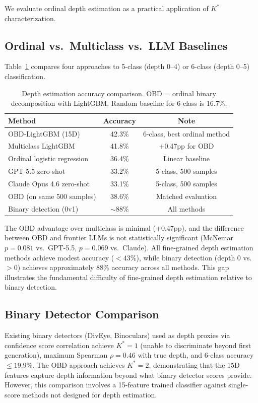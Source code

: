 \documentclass[11pt]{article}
\newcommand{\kstar}{K^*}
\begin{document}
We evaluate ordinal depth estimation as a practical application of $\kstar$ characterization.

\subsection{Ordinal vs.\ Multiclass vs.\ LLM Baselines}

Table~\ref{tab:estimation} compares four approaches to 5-class (depth 0--4) or 6-class (depth 0--5) classification.

\begin{table}[t]
\centering
\caption{Depth estimation accuracy comparison. OBD = ordinal binary decomposition with LightGBM. Random baseline for 6-class is 16.7\%.}
\label{tab:estimation}
\small
\begin{tabular}{lcc}
\toprule
Method & Accuracy & Note \\
\midrule
OBD-LightGBM (15D) & 42.3\% & 6-class, best ordinal method \\
Multiclass LightGBM & 41.8\% & +0.47pp for OBD \\
Ordinal logistic regression & 36.4\% & Linear baseline \\
GPT-5.5 zero-shot & 33.2\% & 5-class, 500 samples \\
Claude Opus 4.6 zero-shot & 33.1\% & 5-class, 500 samples \\
OBD (on same 500 samples) & 38.6\% & Matched evaluation \\
\midrule
Binary detection (0v1) & $\sim$88\% & All methods \\
\bottomrule
\end{tabular}
\end{table}

The OBD advantage over multiclass is minimal (+0.47pp), and the difference between OBD and frontier LLMs is not statistically significant (McNemar $p = 0.081$ vs.\ GPT-5.5, $p = 0.069$ vs.\ Claude). All fine-grained depth estimation methods achieve modest accuracy ($< 43\%$), while binary detection (depth 0 vs.\ $>0$) achieves approximately 88\% accuracy across all methods. This gap illustrates the fundamental difficulty of fine-grained depth estimation relative to binary detection.


\subsection{Binary Detector Comparison}

Existing binary detectors (DivEye, Binoculars) used as depth proxies via confidence score correlation achieve $\kstar{=}1$ (unable to discriminate beyond first generation), maximum Spearman $\rho = 0.46$ with true depth, and 6-class accuracy $\leq 19.9\%$. The OBD approach achieves $\kstar{=}2$, demonstrating that the 15D features capture depth information beyond what binary detector scores provide. However, this comparison involves a 15-feature trained classifier against single-score methods not designed for depth estimation.
\end{document}
